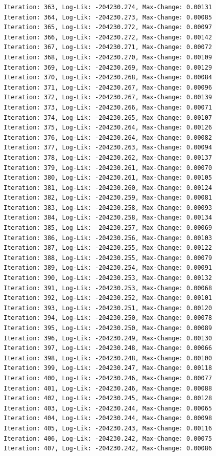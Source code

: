 \documentclass[
  letterpaper,
  DIV=11,
  numbers=noendperiod]{scrreport}
\begin{document}
\begin{verbatim}
Iteration: 363, Log-Lik: -204230.274, Max-Change: 0.00131
Iteration: 364, Log-Lik: -204230.273, Max-Change: 0.00085
Iteration: 365, Log-Lik: -204230.272, Max-Change: 0.00097
Iteration: 366, Log-Lik: -204230.272, Max-Change: 0.00142
Iteration: 367, Log-Lik: -204230.271, Max-Change: 0.00072
Iteration: 368, Log-Lik: -204230.270, Max-Change: 0.00109
Iteration: 369, Log-Lik: -204230.269, Max-Change: 0.00129
Iteration: 370, Log-Lik: -204230.268, Max-Change: 0.00084
Iteration: 371, Log-Lik: -204230.267, Max-Change: 0.00096
Iteration: 372, Log-Lik: -204230.267, Max-Change: 0.00139
Iteration: 373, Log-Lik: -204230.266, Max-Change: 0.00071
Iteration: 374, Log-Lik: -204230.265, Max-Change: 0.00107
Iteration: 375, Log-Lik: -204230.264, Max-Change: 0.00126
Iteration: 376, Log-Lik: -204230.264, Max-Change: 0.00082
Iteration: 377, Log-Lik: -204230.263, Max-Change: 0.00094
Iteration: 378, Log-Lik: -204230.262, Max-Change: 0.00137
Iteration: 379, Log-Lik: -204230.261, Max-Change: 0.00070
Iteration: 380, Log-Lik: -204230.261, Max-Change: 0.00105
Iteration: 381, Log-Lik: -204230.260, Max-Change: 0.00124
Iteration: 382, Log-Lik: -204230.259, Max-Change: 0.00081
Iteration: 383, Log-Lik: -204230.258, Max-Change: 0.00093
Iteration: 384, Log-Lik: -204230.258, Max-Change: 0.00134
Iteration: 385, Log-Lik: -204230.257, Max-Change: 0.00069
Iteration: 386, Log-Lik: -204230.256, Max-Change: 0.00103
Iteration: 387, Log-Lik: -204230.255, Max-Change: 0.00122
Iteration: 388, Log-Lik: -204230.255, Max-Change: 0.00079
Iteration: 389, Log-Lik: -204230.254, Max-Change: 0.00091
Iteration: 390, Log-Lik: -204230.253, Max-Change: 0.00132
Iteration: 391, Log-Lik: -204230.253, Max-Change: 0.00068
Iteration: 392, Log-Lik: -204230.252, Max-Change: 0.00101
Iteration: 393, Log-Lik: -204230.251, Max-Change: 0.00120
Iteration: 394, Log-Lik: -204230.250, Max-Change: 0.00078
Iteration: 395, Log-Lik: -204230.250, Max-Change: 0.00089
Iteration: 396, Log-Lik: -204230.249, Max-Change: 0.00130
Iteration: 397, Log-Lik: -204230.248, Max-Change: 0.00066
Iteration: 398, Log-Lik: -204230.248, Max-Change: 0.00100
Iteration: 399, Log-Lik: -204230.247, Max-Change: 0.00118
Iteration: 400, Log-Lik: -204230.246, Max-Change: 0.00077
Iteration: 401, Log-Lik: -204230.246, Max-Change: 0.00088
Iteration: 402, Log-Lik: -204230.245, Max-Change: 0.00128
Iteration: 403, Log-Lik: -204230.244, Max-Change: 0.00065
Iteration: 404, Log-Lik: -204230.244, Max-Change: 0.00098
Iteration: 405, Log-Lik: -204230.243, Max-Change: 0.00116
Iteration: 406, Log-Lik: -204230.242, Max-Change: 0.00075
Iteration: 407, Log-Lik: -204230.242, Max-Change: 0.00086

\end{verbatim}
\end{document}
